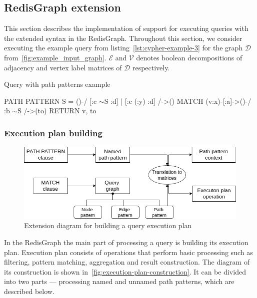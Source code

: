 \subsection{RedisGraph extension}
This section describes the implementation of support for executing queries with the extended syntax in the RedisGraph. Throughout this section, we consider executing the example query from listing~\autoref{lst:cypher-example-3} for the graph $\mathcal{D}$ from~\autoref{fig:example_input_graph}. $\mathcal{E}$ and $\mathcal{V}$ denotes boolean decompositions of adjacency and vertex label matrices of $\mathcal{D}$ respectively. 

\begin{algorithm}
\begin{algorithmic}[1]
\caption{Query with path patterns example}
\label{lst:cypher-example-3}
\State PATH PATTERN S = ()-/ [:c $\sim$S :d] | [:c (:y) :d] /->()
\State MATCH (v:x)-[:a]->()-/ :b $\sim$S /->(to)
\State RETURN v, to
\end{algorithmic}
\end{algorithm}

\subsubsection{Execution plan building}
\begin{figure}[h]
  \centering
  \includegraphics[width=\linewidth]{execution-plan-building.png}
  \caption{Extension diagram for building a query execution plan}
  \label{fig:execution-plan-construction}
\end{figure}

In the RedisGraph the main part of processing a query is building its execution plan. Execution plan consists of operations that perform basic processing such as filtering, pattern matching, aggregation and result construction. The diagram of its construction is shown in~\autoref{fig:execution-plan-construction}. It can be divided into two parts --- processing named and unnamed path patterns, which are described below.

